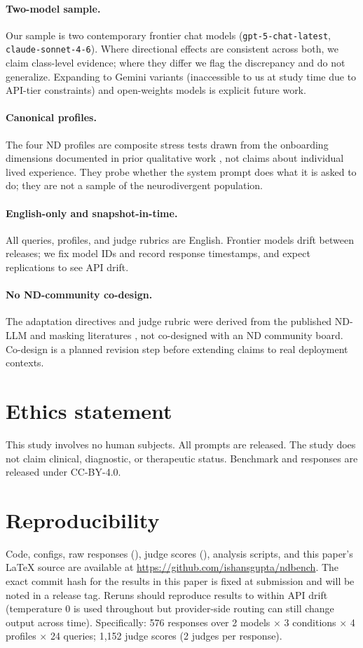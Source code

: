 \documentclass[11pt,letterpaper]{article}
\newcommand{\gpt}{\texttt{gpt-5-chat-latest}}
\newcommand{\claude}{\texttt{claude-sonnet-4-6}}
\begin{document}
\paragraph{Two-model sample.} Our sample is two contemporary frontier chat models (\gpt{}, \claude{}). Where directional effects are consistent across both, we claim class-level evidence; where they differ we flag the discrepancy and do not generalize. Expanding to Gemini variants (inaccessible to us at study time due to API-tier constraints) and open-weights models is explicit future work.

\paragraph{Canonical profiles.} The four ND profiles are composite stress tests drawn from the onboarding dimensions documented in prior qualitative work \citep{carik2025, haroon2024}, not claims about individual lived experience. They probe whether the system prompt does what it is asked to do; they are not a sample of the neurodivergent population.

\paragraph{English-only and snapshot-in-time.} All queries, profiles, and judge rubrics are English. Frontier models drift between releases; we fix model IDs and record response timestamps, and expect replications to see API drift.

\paragraph{No ND-community co-design.} The adaptation directives and judge rubric were derived from the published ND-LLM and masking literatures \citep{hull2017, pearson2021, carik2025}, not co-designed with an ND community board. Co-design is a planned revision step before extending claims to real deployment contexts.

\section*{Ethics statement}
This study involves no human subjects. All prompts are released. The study does not claim clinical, diagnostic, or therapeutic status. Benchmark and responses are released under CC-BY-4.0.

\section*{Reproducibility}
Code, configs, raw responses (), judge scores (), analysis scripts, and this paper's \LaTeX{} source are available at \url{https://github.com/ishansgupta/ndbench}. The exact commit hash for the results in this paper is fixed at submission and will be noted in a release tag. Reruns should reproduce results to within API drift (temperature $0$ is used throughout but provider-side routing can still change output across time). Specifically: 576 responses over 2 models $\times$ 3 conditions $\times$ 4 profiles $\times$ 24 queries; 1{,}152 judge scores (2 judges per response).
\end{document}
